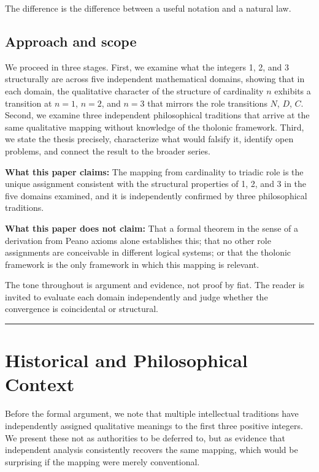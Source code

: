 \documentclass[12pt]{article}
\begin{document}
The difference is the difference between a useful notation and a natural
law.

\subsection{Approach and scope}\label{approach-and-scope}

We proceed in three stages. First, we examine what the integers 1, 2,
and 3 structurally are across five independent mathematical domains,
showing that in each domain, the qualitative character of the structure
of cardinality \(n\) exhibits a transition at \(n = 1\), \(n = 2\), and
\(n = 3\) that mirrors the role transitions \(N\), \(D\), \(C\). Second,
we examine three independent philosophical traditions that arrive at the
same qualitative mapping without knowledge of the tholonic framework.
Third, we state the thesis precisely, characterize what would falsify
it, identify open problems, and connect the result to the broader
series.

\textbf{What this paper claims:} The mapping from cardinality to triadic
role is the unique assignment consistent with the structural properties
of 1, 2, and 3 in the five domains examined, and it is independently
confirmed by three philosophical traditions.

\textbf{What this paper does not claim:} That a formal theorem in the
sense of a derivation from Peano axioms alone establishes this; that no
other role assignments are conceivable in different logical systems; or
that the tholonic framework is the only framework in which this mapping
is relevant.

The tone throughout is argument and evidence, not proof by fiat. The
reader is invited to evaluate each domain independently and judge
whether the convergence is coincidental or structural.

\begin{center}\rule{0.5\linewidth}{0.5pt}\end{center}

\section{Historical and Philosophical Context}\label{historical-and-philosophical-context}

Before the formal argument, we note that multiple intellectual
traditions have independently assigned qualitative meanings to the first
three positive integers. We present these not as authorities to be
deferred to, but as evidence that independent analysis consistently
recovers the same mapping, which would be surprising if the mapping were
merely conventional.
\end{document}
